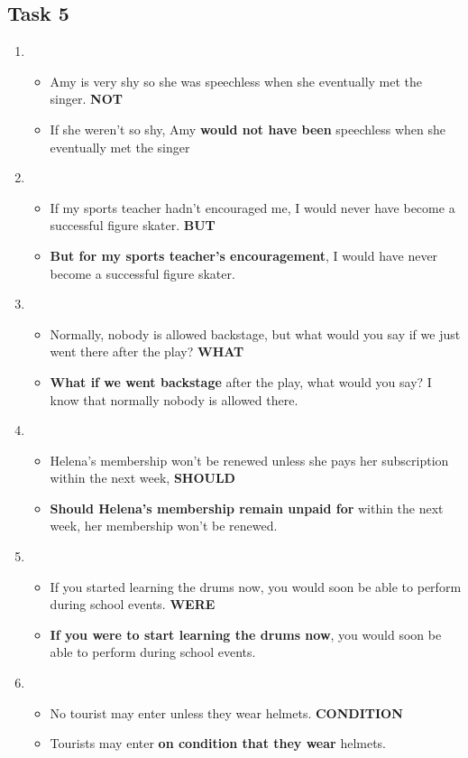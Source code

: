 \documentclass[a4paper]{article}
\begin{document}
\subsection{Task 5}
\begin{enumerate}
    \item \begin{itemize}
        \item Amy is very shy so she was speechless when she eventually met the singer. \textbf{NOT}
        \item If she weren't so shy, Amy {\bf would not have been} speechless when she eventually met the singer
    \end{itemize}
    \item \begin{itemize}
        \item If my sports teacher hadn't encouraged me, I would never have become a successful figure skater. {\bf BUT}
        \item {\bf But for my sports teacher's encouragement}, I would have never become a successful figure skater.
    \end{itemize}
    \item \begin{itemize}
        \item Normally, nobody is allowed backstage, but what would you say if we just went there after the play? {\bf WHAT}
        \item {\bf What if we went backstage} after the play, what would you say? I know that normally nobody is allowed there.
    \end{itemize}
    \item \begin{itemize}
        \item Helena's membership won't be renewed unless she pays her subscription within the next week, {\bf SHOULD}
        \item {\bf Should Helena's membership remain unpaid for} within the next week, her membership won't be renewed.
    \end{itemize}
    \item \begin{itemize}
        \item If you started learning the drums now, you would soon be able to perform during school events. {\bf WERE}
        \item {\bf If you were to start learning the drums now}, you would soon be able to perform during school events.
    \end{itemize}
    \item \begin{itemize}
        \item No tourist may enter unless they wear helmets. {\bf CONDITION}
        \item Tourists may enter {\bf on condition that they wear} helmets.
    \end{itemize}
\end{enumerate}
\end{document}
